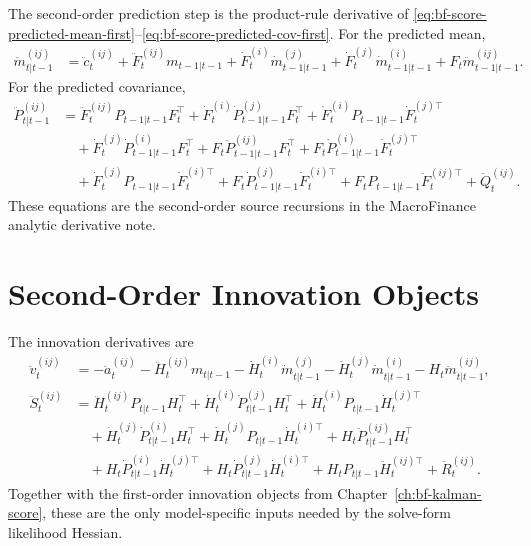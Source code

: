 The second-order prediction step is the product-rule derivative of
\eqref{eq:bf-score-predicted-mean-first}--\eqref{eq:bf-score-predicted-cov-first}.
For the predicted mean,
\begin{align}
\label{eq:bf-hessian-predicted-mean}
  \ddot m_{t|t-1}^{(ij)}
  &=
  \ddot c_t^{(ij)}
  +\ddot F_t^{(ij)}m_{t-1|t-1}
  +\dot F_t^{(i)}\dot m_{t-1|t-1}^{(j)}
  +\dot F_t^{(j)}\dot m_{t-1|t-1}^{(i)}
  +F_t\ddot m_{t-1|t-1}^{(ij)} .
\end{align}
For the predicted covariance,
\begin{align}
\label{eq:bf-hessian-predicted-cov}
  \ddot P_{t|t-1}^{(ij)}
  &=
  \ddot F_t^{(ij)}P_{t-1|t-1}F_t^\top
  +\dot F_t^{(i)}\dot P_{t-1|t-1}^{(j)}F_t^\top
  +\dot F_t^{(i)}P_{t-1|t-1}\dot F_t^{(j)\top} \nonumber\\
  &\quad
  +\dot F_t^{(j)}\dot P_{t-1|t-1}^{(i)}F_t^\top
  +F_t\ddot P_{t-1|t-1}^{(ij)}F_t^\top
  +F_t\dot P_{t-1|t-1}^{(i)}\dot F_t^{(j)\top} \nonumber\\
  &\quad
  +\dot F_t^{(j)}P_{t-1|t-1}\dot F_t^{(i)\top}
  +F_t\dot P_{t-1|t-1}^{(j)}\dot F_t^{(i)\top}
  +F_tP_{t-1|t-1}\ddot F_t^{(ij)\top}
  +\ddot Q_t^{(ij)} .
\end{align}
These equations are the second-order source recursions in the MacroFinance
analytic derivative note.

\section{Second-Order Innovation Objects}
\label{sec:bf-hessian-innovation}

The innovation derivatives are
\begin{align}
\label{eq:bf-hessian-innovation}
  \ddot v_t^{(ij)}
  &=
  -\ddot a_t^{(ij)}
  -\ddot H_t^{(ij)}m_{t|t-1}
  -\dot H_t^{(i)}\dot m_{t|t-1}^{(j)}
  -\dot H_t^{(j)}\dot m_{t|t-1}^{(i)}
  -H_t\ddot m_{t|t-1}^{(ij)},\\
\label{eq:bf-hessian-innovation-cov}
  \ddot S_t^{(ij)}
  &=
  \ddot H_t^{(ij)}P_{t|t-1}H_t^\top
  +\dot H_t^{(i)}\dot P_{t|t-1}^{(j)}H_t^\top
  +\dot H_t^{(i)}P_{t|t-1}\dot H_t^{(j)\top} \nonumber\\
  &\quad
  +\dot H_t^{(j)}\dot P_{t|t-1}^{(i)}H_t^\top
  +\dot H_t^{(j)}P_{t|t-1}\dot H_t^{(i)\top}
  +H_t\ddot P_{t|t-1}^{(ij)}H_t^\top \nonumber\\
  &\quad
  +H_t\dot P_{t|t-1}^{(i)}\dot H_t^{(j)\top}
  +H_t\dot P_{t|t-1}^{(j)}\dot H_t^{(i)\top}
  +H_tP_{t|t-1}\ddot H_t^{(ij)\top}
  +\ddot R_t^{(ij)}.
\end{align}
Together with the first-order innovation objects from
Chapter~\ref{ch:bf-kalman-score}, these are the only model-specific inputs
needed by the solve-form likelihood Hessian.

